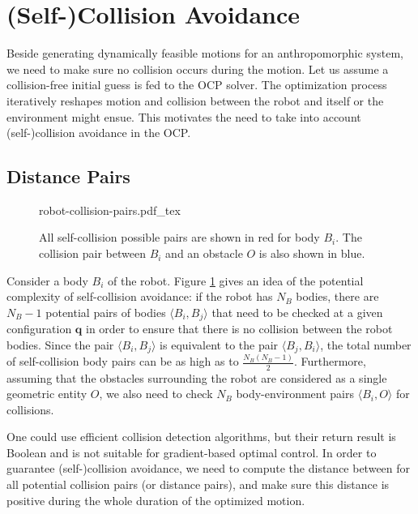 \section{(Self-)Collision Avoidance}
\label{sec:chap3-collision-avoidance}

Beside generating dynamically feasible motions for an anthropomorphic
system, we need to make sure no collision occurs during the
motion. Let us assume a collision-free initial guess is fed to the OCP
solver. The optimization process iteratively reshapes motion and
collision between the robot and itself or the environment might
ensue. This motivates the need to take into account (self-)collision
avoidance in the OCP.

\subsection{Distance Pairs}

\begin{figure}
  \centering
      {\def\svgwidth{0.59\linewidth}
        
                   {robot-collision-pairs.pdf_tex}
      }
      \caption{All self-collision possible pairs are shown in red for
        body $B_i$. The collision pair between $B_i$ and an obstacle
        $O$ is also shown in blue.}
      \label{fig:chap3-robot-collision-pairs}
\end{figure}

Consider a body $B_i$ of the robot. Figure
\ref{fig:chap3-robot-collision-pairs} gives an idea of the potential
complexity of self-collision avoidance: if the robot has $N_B$ bodies,
there are $N_B-1$ potential pairs of bodies $\langle B_i,B_j\rangle$
that need to be checked at a given configuration $\mathbf{q}$ in order
to ensure that there is no collision between the robot bodies. Since
the pair $\langle B_i,B_j\rangle$ is equivalent to the pair $\langle
B_j,B_i\rangle$, the total number of self-collision body pairs can be
as high as to $\frac{N_B(N_B-1)}{2}$. Furthermore, assuming that the
obstacles surrounding the robot are considered as a single geometric
entity $O$, we also need to check $N_B$ body-environment pairs
$\langle B_i,O\rangle$ for collisions.

One could use efficient collision detection algorithms, but their
return result is Boolean and is not suitable for gradient-based
optimal control. In order to guarantee (self-)collision avoidance, we
need to compute the distance between for all potential collision pairs
(or distance pairs), and make sure this distance is positive during
the whole duration of the optimized motion.

